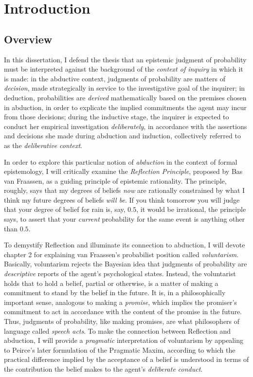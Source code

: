 
\hypertarget{introduction}{%
\chapter{Introduction}\label{ch:introduction}}

\hypertarget{overview}{%
\section{Overview}\label{overview}}

In this dissertation, I defend the thesis that an epistemic judgment of
probability must be interpreted against the background of the
\emph{context of inquiry} in which it is made: in the abductive context,
judgments of probability are matters of \emph{decision}, made
strategically in service to the investigative goal of the inquirer; in
deduction, probabilities are \emph{derived} mathematically based on the
premises chosen in abduction, in order to explicate the implied
commitments the agent may incur from those decisions; during the
inductive stage, the inquirer is expected to conduct her empirical
investigation \emph{deliberately}, in accordance with the assertions and
decisions she made during abduction and induction, collectively referred
to as the \emph{deliberative context}.

In order to explore this particular notion of \emph{abduction} in the
context of formal epistemology, I will critically examine the
\emph{Reflection Principle}, proposed by Bas van Fraassen, as a guiding
principle of epistemic rationality. The principle, roughly, says that my
degrees of beliefs \emph{now} are rationally constrained by what I think
my future degrees of beliefs \emph{will be}. If you think tomorrow you
will judge that your degree of belief for rain is, say, \(0.5\), it
would be irrational, the principle says, to assert that your \emph{current}
probability for the same event is anything other than \(0.5\).

To demystify Reflection and illuminate its connection to abduction, I
will devote chapter 2 for explaining van Fraassen's probabilist position
called \emph{voluntarism}. Basically, voluntarism rejects the Bayesian
idea that judgments of probability are \emph{descriptive} reports of the
agent's psychological states. Instead, the voluntarist holds that to hold
a belief, partial or otherwise, is a matter of making a commitment to
stand by the belief in the future. It is, in a philosophically important
sense, analogous to making a \emph{promise}, which implies the
promiser's commitment to act in accordance with the content of the promise in the future. Thus, judgments of probability, like making promises, are what philosophers of language called \emph{speech acts}. To make the connection
between Reflection and abduction, I will provide a \emph{pragmatic}
interpretation of voluntarism by appealing to Peirce's later
formulation of the Pragmatic Maxim, according to which the practical difference implied by the acceptance of a belief is understood in terms of the contribution the belief makes to the agent's \emph{deliberate conduct}.

